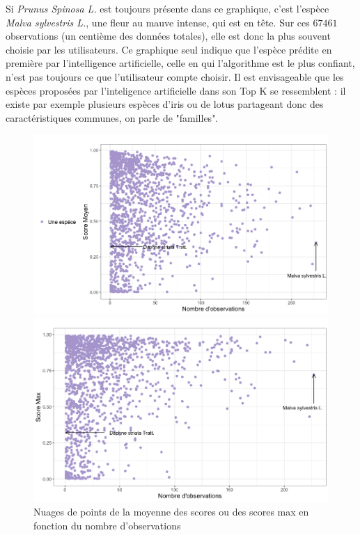 \documentclass[a4paper,12pt]{article}
\begin{document}
\vspace{0.2cm}

Si \textit{Prunus Spinosa L.} est toujours présente dans ce graphique, c'est l'espèce \textit{Malva sylvestris L.}, une fleur au mauve intense, qui est en tête. Sur ces $\num{67 461}$ observations (un centième des données totales), elle est donc la plus souvent choisie par les utilisateurs. Ce graphique seul indique que l'espèce prédite en première par l'intelligence artificielle, celle en qui l'algorithme est le plus confiant, n'est pas toujours ce que l'utilisateur compte choisir. Il est envisageable que les espèces proposées par l'inteligence artificielle dans son Top K se ressemblent : il existe par exemple plusieurs espèces d'iris ou de lotus partageant donc des caractéristiques communes, on parle de "familles".

\begin{figure}[H]
    \centering
    \begin{minipage}{0.5\textwidth}
      \includegraphics[width=0.9\linewidth]{images/mean_rd_users.png}
    \end{minipage}%
    \begin{minipage}{0.5\textwidth}
      \includegraphics[width=0.9\linewidth]{images/max_rd_users.png}
    \end{minipage}
    \caption{Nuages de points de la moyenne des scores ou des scores max en fonction du nombre d'observations}
\end{figure}
\end{document}
